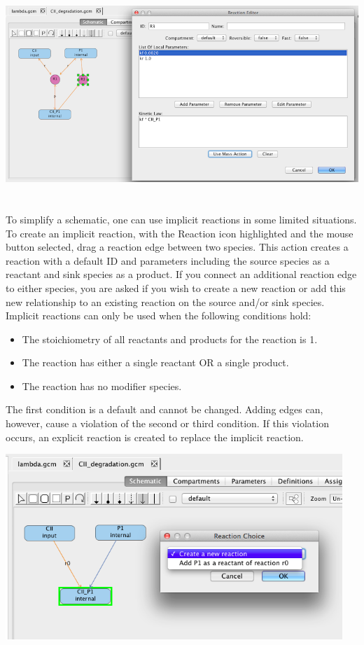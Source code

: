\documentclass[titlepage,11pt]{article}
\begin{document}
\begin{center}
\includegraphics[height=80mm]{screenshots/kineticLaw} 
\end{center}

To simplify a schematic, one can use implicit reactions in some limited situations.  To create an implicit reaction, with the Reaction icon highlighted and the mouse button selected, drag a reaction edge between two species.  This action creates a reaction with a default ID and parameters including the source species as a reactant and sink species as a product.  If you connect an additional reaction edge to either species, you are asked if you wish to create a new reaction or add this new relationship to an existing reaction on the source and/or sink species.  Implicit reactions can only be used when the following conditions hold:
\begin{itemize}
\item The stoichiometry of all reactants and products for the reaction is 1.
\item The reaction has either a single reactant OR a single product.
\item The reaction has no modifier species.
\end{itemize}
The first condition is a default and cannot be changed.  Adding edges can, however, cause a violation of the second or third condition.  If this violation occurs, an explicit reaction is created to replace the implicit reaction.

\begin{center}
\includegraphics[height=70mm]{screenshots/implicitReactions} 
\end{center}
\end{document}
